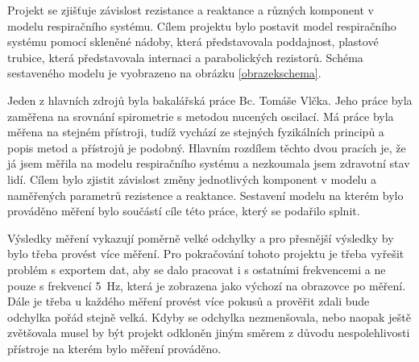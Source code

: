 Projekt se zjišťuje závislost rezistance a reaktance a různých komponent v modelu respiračního systému. 
Cílem projektu bylo postavit model respiračního systému pomocí skleněné nádoby, která představovala poddajnost, plastové trubice, která představovala internaci a parabolických rezistorů.  Schéma sestaveného modelu je vyobrazeno na obrázku \ref{obrazekschema}. 

Jeden z hlavních zdrojů byla bakalářská práce Bc. Tomáše Vlčka. Jeho práce byla zaměřena na srovnání spirometrie s metodou nucených oscilací. Má práce byla měřena na stejném přístroji, tudíž vychází ze stejných fyzikálních principů a popis metod a přístrojů je podobný. Hlavním rozdílem těchto dvou pracích je, že já jsem měřila na modelu respiračního systému a nezkoumala jsem zdravotní stav lidí. Cílem bylo zjistit závislost změny jednotlivých komponent v modelu a naměřených parametrů rezistence a reaktance. Sestavení modelu na kterém bylo prováděno měření bylo součástí cíle této práce, který se podařilo splnit. 

Výsledky měření vykazují poměrně velké odchylky a pro přesnější výsledky by bylo třeba provést více měření. Pro pokračování tohoto projektu je třeba vyřešit problém s exportem dat, aby se dalo pracovat i s ostatními frekvencemi a ne pouze s frekvencí \SI{5}{Hz}, která je zobrazena jako výchozí na obrazovce po měření. Dále je třeba u každého měření provést více pokusů a prověřit zdali bude odchylka pořád stejně velká. Kdyby se odchylka nezmenšovala, nebo naopak ještě zvětšovala musel by být projekt odkloněn jiným směrem z důvodu nespolehlivosti přístroje na kterém bylo měření prováděno. 
